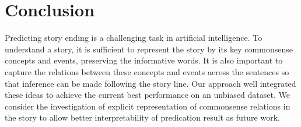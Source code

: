 \section{Conclusion}
Predicting story ending is a challenging task in artificial intelligence.
To understand a story, it is sufficient to represent the story by its key
commonsense concepts and events, preserving the informative words.
It is also important to capture the relations between these concepts and
events across the sentences so that inference can be made following
the story line. 
Our approach well integrated these ideas to achieve the 
current best performance on an unbiased dataset. 
We consider the investigation of
explicit representation of commonsense relations in the story to allow
better interpretability of predication result as future work. 
